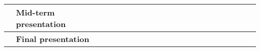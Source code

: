 \begin{table}[ht!]
\begin{tabular}{lp{2.5in}|llllllllllllllllllll|}
    \multicolumn{1}{|l|}{\cellcolor[HTML]{00E2FF}\textbf{}}                & \cellcolor[HTML]{00E2FF}\textbf{Mid-term presentation}                     & \multicolumn{1}{l|}{}                                   & \multicolumn{1}{l|}{}                                   & \multicolumn{1}{l|}{}                                   & \multicolumn{1}{l|}{}                                   & \multicolumn{1}{l|}{}                                   & \multicolumn{1}{l|}{}                                   & \multicolumn{1}{l|}{}                                   & \multicolumn{1}{l|}{}                                   & \multicolumn{1}{l|}{}                                   & \multicolumn{1}{l|}{\cellcolor[HTML]{F8A102}}            & \multicolumn{1}{l|}{}                                    & \multicolumn{1}{l|}{}                                    & \multicolumn{1}{l|}{}                                    & \multicolumn{1}{l|}{}                                    & \multicolumn{1}{l|}{}                                    & \multicolumn{1}{l|}{}                                    & \multicolumn{1}{l|}{}                                    & \multicolumn{1}{l|}{}                                    & \multicolumn{1}{l|}{}                                    &             \\ \hline
    \multicolumn{1}{|l|}{\cellcolor[HTML]{00E2FF}\textbf{}}                & \cellcolor[HTML]{00E2FF}\textbf{Final presentation}                        & \multicolumn{1}{l|}{}                                   & \multicolumn{1}{l|}{}                                   & \multicolumn{1}{l|}{}                                   & \multicolumn{1}{l|}{}                                   & \multicolumn{1}{l|}{}                                   & \multicolumn{1}{l|}{}                                   & \multicolumn{1}{l|}{}                                   & \multicolumn{1}{l|}{}                                   & \multicolumn{1}{l|}{}                                   & \multicolumn{1}{l|}{}                                    & \multicolumn{1}{l|}{}                                    & \multicolumn{1}{l|}{}                                    & \multicolumn{1}{l|}{}                                    & \multicolumn{1}{l|}{}                                    & \multicolumn{1}{l|}{}                                    & \multicolumn{1}{l|}{}                                    & \multicolumn{1}{l|}{}                                    & \multicolumn{1}{l|}{\cellcolor[HTML]{F8A102}}            & \multicolumn{1}{l|}{\cellcolor[HTML]{F8A102}}            &             \\ \hline

\end{tabular}
\end{table}
